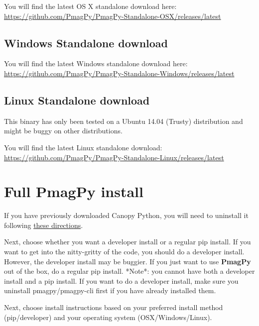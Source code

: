 \documentclass[11pt]{book}
\begin{document}
{\noindent You will find the latest OS X standalone download here: \href{https://github.com/PmagPy/PmagPy-Standalone-OSX/releases/latest}{https://github.com/PmagPy/PmagPy-Standalone-OSX/releases/latest}

\subsection{Windows Standalone download}

\noindent You will find the latest Windows standalone download here: \href{https://github.com/PmagPy/PmagPy-Standalone-Windows/releases/latest}{https://github.com/PmagPy/PmagPy-Standalone-Windows/releases/latest}

\subsection{Linux Standalone download}

This binary has only been tested on a Ubuntu 14.04 (Trusty) distribution and might be buggy on other distributions.

\noindent You will find the latest Linux standalone download: \href{https://github.com/PmagPy/PmagPy-Standalone-Linux/releases/latest}{https://github.com/PmagPy/PmagPy-Standalone-Linux/releases/latest}





\section{Full PmagPy install}


If you have previously downloaded Canopy Python, you will need to uninstall it following \href{https://support.enthought.com/hc/en-us/articles/204469700-Uninstalling-and-resetting-Canopy}{these directions}.

Next, choose whether you want a developer install or a regular pip install.  If you want to get into the nitty-gritty of the code, you should do a developer install.  However, the developer install may be buggier.  If you just want to use {\bf PmagPy} out of the box, do a regular pip install.  *Note*: you cannot have both a developer install and a pip install.  If you want to do a developer install, make sure you uninstall pmagpy/pmagpy-cli first if you have already installed them.

Next, choose install instructions based on your preferred install method (pip/developer) and your operating system (OSX/Windows/Linux).

}
\end{document}
